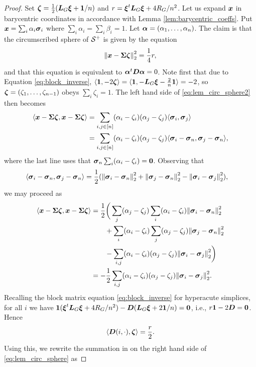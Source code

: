 \begin{proof}
Set $\vb*{\zeta} = \frac{1}{2}(\vb*{L}_G\vb*{\xi} + \vb{1}/n)$ and $r = \vb*{\xi}^t \vb*{L}_G\vb*{\xi}+4R_G/n^2$. 
Let us expand $\vb*{x}$ in barycentric coordinates in accordance with Lemma \ref{lem:barycentric_coeffs}.  Put $\vb*{x}=\sum_i \alpha_i\vb*{\sigma}_i$ where $\sum_i\alpha_i=\sum_i\beta_i=1$. Let $\vb*{\alpha}=(\alpha_1,\dots,\alpha_n)$. 
The claim is that the circumscribed sphere of $\mathcal{S}^+$ is given by the equation 
\begin{equation}
\label{eq:lem_circ_sphere2}
\norm{\vb*{x} - \boldsymbol{\Sigma}\vb*{\zeta}}_2^2 = \frac{1}{4}r,
\end{equation}
and that this equation is equivalent to $\vb*{\alpha}^t \vb*{D}\vb*{\alpha}=0$. Note first that due to Equation \ref{eq:block_inverse}, $\langle \vb{1}, -2\vb*{\zeta}\rangle = \langle \vb{1}, -\vb*{L}_G\vb*{\xi} - \frac{2}{n}\vb{1}\rangle = -2$, so $\vb*{\zeta}=(\zeta_1,\dots,\zeta_{n-1})$ obeys $\sum_i \zeta_i=1$.  The left hand side of \eqref{eq:lem_circ_sphere2} then becomes 
\begin{align*}
\langle \vb*{x}-\boldsymbol{\Sigma}\vb*{\zeta},\vb*{x}-\boldsymbol{\Sigma}\vb*{\zeta}\rangle &= \sum_{i,j\in[n]} (\alpha_i-\zeta_i)(\alpha_j-\zeta_j) \langle \vb*{\sigma}_i,\vb*{\sigma}_j\rangle \\
&= \sum_{i,j\in[n]} (\alpha_i-\zeta_i)(\alpha_j-\zeta_j) \langle \vb*{\sigma}_i-\vb*{\sigma}_n,\vb*{\sigma}_j-\vb*{\sigma}_n\rangle,
\end{align*} 
where the last line uses that $\vb*{\sigma}_n \sum_i(\alpha_i-\zeta_i)=\vb{0}$. 
Observing that 
\begin{align*}
\langle \vb*{\sigma}_i-\vb*{\sigma}_n,\vb*{\sigma}_j-\vb*{\sigma}_n\rangle &= \frac{1}{2}(\norm{\vb*{\sigma}_i-\vb*{\sigma}_n}_2^2 + \norm{\vb*{\sigma}_j-\vb*{\sigma}_n}_2^2 - \norm{\vb*{\sigma}_i-\vb*{\sigma}_j}_2^2),
\end{align*}
we may proceed as
\begin{align}
\langle\vb*{x}-\boldsymbol{\Sigma}\vb*{\zeta},\vb*{x}-\boldsymbol{\Sigma}\vb*{\zeta}\rangle &= \frac{1}{2}\bigg(\sum_j (\alpha_j-\zeta_j) \sum_i (\alpha_i-\zeta_i)\norm{\vb*{\sigma}_i-\vb*{\sigma}_n}_2^2 \notag \\
&\qquad + \sum_i (\alpha_i-\zeta_i) \sum_j (\alpha_j-\zeta_j)\norm{\vb*{\sigma}_j-\vb*{\sigma}_n}_2^2  \notag \\
&\qquad - \sum_{i,j} (\alpha_i-\zeta_i)(\alpha_j-\zeta_j)\norm{\vb*{\sigma}_i-\vb*{\sigma}_j}_2^2 \bigg)\notag \\
&= -\frac{1}{2}\sum_{i,j} (\alpha_i-\zeta_i)(\alpha_j-\zeta_j)\norm{\vb*{\sigma}_i-\vb*{\sigma}_j}_2^2. \label{eq:lem_circ_sphere}
\end{align} 
Recalling the block matrix equation \eqref{eq:block_inverse} for hyperacute simplices, for all $i$ we have $\vb{1} (\vb*{\xi}^t \vb*{L}_G\vb*{\xi} + 4R_G/n^2) - \vb*{D}(\vb*{L}_G\vb*{\xi} + 2\vb{1} /n) = \vb{0}$, i.e., $r\vb{1} -2\vb*{D} =\vb{0}$. Hence 
\[\langle \vb*{D}(i,\cdot),\vb*{\zeta}\rangle = \frac{r}{2}.\]
Using this, we rewrite the summation in on the right hand side of \eqref{eq:lem_circ_sphere} as 

\end{proof}
